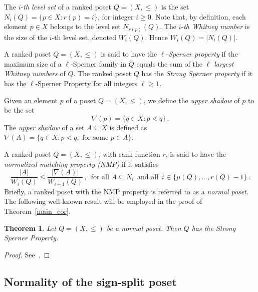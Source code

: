 \documentclass[11pt]{article}
\newtheorem{theorem}{Theorem}
\begin{document}
The $i$-\emph{th level set} of a ranked poset $Q=(X,\le)$ is the set 
$N_i(Q) = \{p\in X : r(p)=i\}$, for integer $i\ge 0$. 
Note that, by definition, each element $p\in X$ belongs to the level set $N_{r(p)}(Q)$. 
The $i$-\emph{th Whitney number} is the size of the $i$-th level set, denoted $W_i(Q)$. Hence $W_i(Q)= |N_i(Q)|$. 

A ranked poset $Q=(X,\le)$ is said to have the 
$\ell$-\emph{Sperner property} if the maximum size of a 
$\ell$-Sperner family in $Q$ equals the sum  of the \emph{$\ell$ largest Whitney numbers} of $Q$. The ranked poset $Q$ has the \emph{Strong Sperner property} if it has the $\ell$-Sperner Property for all integers  $\ell\ge 1$. 

Given an element $p$ of a poset $Q=(X,\le)$, we define the \emph{upper shadow} of $p$ to be the set 
\[
\nabla(p) = \{q\in X : p\lessdot q\} \, . 
\]
The \emph{upper shadow} of a set $A\subseteq X$ is defined  as  $\nabla(A)=\{q\in X : p\lessdot q, \text{ for some } p\in A\}$. 


A ranked poset $Q=(X,\le)$, with rank function $r$, is said to have the 
\emph{normalized matching property (NMP)} if it satisfies 
\[
\frac{|A|}{W_i(Q)}\le \frac{|\nabla (A)|}{W_{i+1}(Q)} \, ,\, \text{ for all } A\subseteq N_i \, \text{ and all } \, i \in \{\mu(Q),\ldots, r(Q)-1 \}\, .
\]
Briefly, a ranked poset with the NMP property is referred to as a \emph{normal poset}. The following well-known result will be employed in the proof of Theorem~\ref{main_cor}. 

\begin{theorem}\label{engel_thm}
Let $Q=(X,\le)$ be a normal poset. Then $Q$ has the Strong Sperner Property. 
\end{theorem}
\begin{proof}
See~\cite[Theorem~4.5.1 and Corollary~4.5.3]{Engel}.  
\end{proof}




\subsection{Normality of  the sign-split  poset}\label{sec:sign_split}
\end{document}
